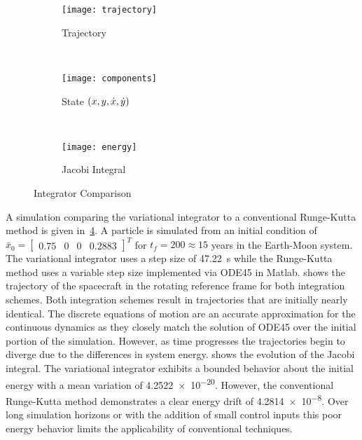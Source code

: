 \documentclass[letterpaper, paper,11pt]{AAS}		%
\begin{document}
\begin{figure} 
	\centering 
	\begin{subfigure}[h]{0.3\textwidth} 
		\texttt{[image: trajectory]} 
		\caption{Trajectory} \label{fig:compare_trajectory} 
	\end{subfigure}~ %
	\begin{subfigure}[htbp]{0.3\textwidth} 
		\texttt{[image: components]} 
		\caption{State \( \left( x , y, \dot{x}, \dot{y} \right)\)} \label{fig:compare_components} 
	\end{subfigure} ~ %
	\begin{subfigure}[htbp]{0.3\textwidth} 
		\texttt{[image: energy]} 
		\caption{Jacobi Integral} \label{fig:compare_energy} 
	\end{subfigure} 
	\caption{Integrator Comparison}
	\label{fig:integrator_compare} 
\end{figure}
A simulation comparing the variational integrator to a conventional Runge-Kutta method is given in~\cref{fig:integrator_compare}.
A particle is simulated from an initial condition of \( \bar{x}_0 = \begin{bmatrix} 0.75 & 0 & 0 & 0.2883\end{bmatrix}^T \) for \( t_f = 200 \approx 15\) years in the Earth-Moon system.
The variational integrator uses a step size of \SI{47.22}{\second} while the Runge-Kutta method uses a variable step size implemented via ODE45 in Matlab.
 shows the trajectory of the spacecraft in the rotating reference frame for both integration schemes.
Both integration schemes result in trajectories that are initially nearly identical.
The discrete equations of motion are an accurate approximation for the continuous dynamics as they closely match the solution of ODE45 over the initial portion of the simulation.
However, as time progresses the trajectories begin to diverge due to the differences in system energy.
 shows the evolution of the Jacobi integral.
The variational integrator exhibits a bounded behavior about the initial energy with a mean variation of \num{4.2522e-20}.
However, the conventional Runge-Kutta method demonstrates a clear energy drift of \num{4.2814e-8}. 
Over long simulation horizons or with the addition of small control inputs this poor energy behavior limits the applicability of conventional techniques.
\end{document}
